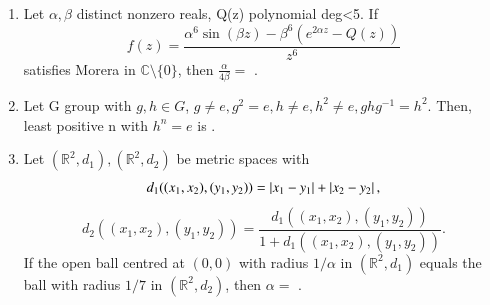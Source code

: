\documentclass[journal,12pt,onecolumn]{IEEEtran}
\theoremstyle{remark}
\begin{document}
\begin{enumerate}
\item Let $\alpha,\beta$ distinct nonzero reals, Q(z) polynomial deg<5. If  
$$
f(z)=\frac{\alpha^6\sin(\beta z)-\beta^6(e^{2\alpha z}-Q(z))}{z^6}
$$  
satisfies Morera in $\mathbb{C}\setminus\{0\}$, then $\tfrac{\alpha}{4\beta}=$ \underline{\hspace{2cm}}.  
\hfill{}

\item Let G group with $g,h\in G$, $g\neq e,g^2=e,h\neq e,h^2\neq e, ghg^{-1}=h^2$. Then, least positive n with $h^n=e$ is \underline{\hspace{2cm}}.  
\hfill{}

\item Let $(\mathbb{R}^2,d_1),(\mathbb{R}^2,d_2)$ be metric spaces with  
$$
d_1((x_1,x_2),(y_1,y_2))=\left\vert x_1-y_1\right\vert+\left\vert x_2-y_2\right\vert,
$$  
$$
d_2((x_1,x_2),(y_1,y_2))=\frac{d_1((x_1,x_2),(y_1,y_2))}{1+d_1((x_1,x_2),(y_1,y_2))}.
$$  
If the open ball centred at $(0,0)$ with radius $1/\alpha$ in $(\mathbb{R}^2,d_1)$ equals the ball with radius $1/7$ in $(\mathbb{R}^2,d_2)$, then $\alpha=$ \underline{\hspace{2cm}}.  
\hfill{}



\end{enumerate}
\end{document}
